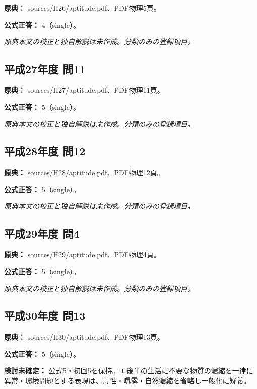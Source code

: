 \noindent\textbf{原典：} sources/H26/aptitude.pdf、PDF物理5頁。

\textbf{公式正答：} 4（single）。

\par\textit{原典本文の校正と独自解説は未作成。分類のみの登録項目。}

\subsection{平成27年度 問11}
\label{q:h27-reg-apt-11}

\noindent\textbf{原典：} sources/H27/aptitude.pdf、PDF物理11頁。

\textbf{公式正答：} 5（single）。

\par\textit{原典本文の校正と独自解説は未作成。分類のみの登録項目。}

\subsection{平成28年度 問12}
\label{q:h28-reg-apt-12}

\noindent\textbf{原典：} sources/H28/aptitude.pdf、PDF物理12頁。

\textbf{公式正答：} 5（single）。

\par\textit{原典本文の校正と独自解説は未作成。分類のみの登録項目。}

\subsection{平成29年度 問4}
\label{q:h29-reg-apt-04}

\noindent\textbf{原典：} sources/H29/aptitude.pdf、PDF物理4頁。

\textbf{公式正答：} 5（single）。

\par\textit{原典本文の校正と独自解説は未作成。分類のみの登録項目。}

\subsection{平成30年度 問13}
\label{q:h30-reg-apt-13}

\noindent\textbf{原典：} sources/H30/aptitude.pdf、PDF物理13頁。

\textbf{公式正答：} 5（single）。

\par\textbf{検討未確定：} 公式5・初回5を保持。エ後半の生活に不要な物質の濃縮を一律に異常・環境問題とする表現は、毒性・曝露・自然濃縮を省略し一般化に疑義。

